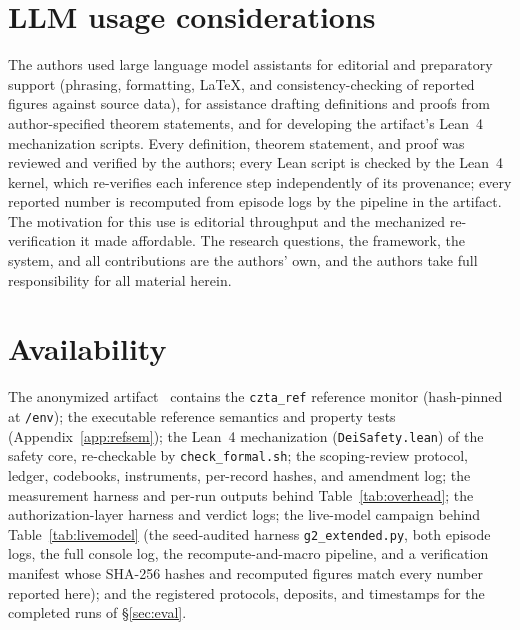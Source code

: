 \documentclass[conference,compsoc]{IEEEtran}
\theoremstyle{definition}
\theoremstyle{plain}
\begin{document}
\section*{LLM usage considerations}
The authors used large language model assistants for editorial and
preparatory support (phrasing, formatting, \LaTeX, and
consistency-checking of reported figures against source data), for
assistance drafting definitions and proofs from author-specified
theorem statements, and for developing the artifact's Lean~4
mechanization scripts. Every definition, theorem statement, and proof
was reviewed and verified by the authors; every Lean script is checked
by the Lean~4 kernel, which re-verifies each inference step
independently of its provenance; every reported number is recomputed
from episode logs by the pipeline in the artifact. The motivation for
this use is editorial throughput and the mechanized re-verification it
made affordable. The research questions, the framework, the system,
and all contributions are the authors' own, and the authors take full
responsibility for all material herein.

\section*{Availability}
The anonymized artifact~\cite{artifact} contains the \texttt{czta\_ref}
reference monitor (hash-pinned at \texttt{/env}); the executable
reference semantics and property tests (Appendix~\ref{app:refsem}); the
Lean~4 mechanization (\texttt{DeiSafety.lean}) of the safety core,
re-checkable by \texttt{check\_formal.sh}; the scoping-review protocol,
ledger, codebooks, instruments, per-record hashes, and amendment log;
the measurement harness and per-run outputs behind
Table~\ref{tab:overhead}; the authorization-layer harness and verdict
logs; the live-model campaign behind Table~\ref{tab:livemodel} (the
seed-audited harness \texttt{g2\_extended.py}, both episode logs, the
full console log, the recompute-and-macro pipeline, and a verification
manifest whose SHA-256 hashes and recomputed figures match every number
reported here); and the registered protocols, deposits, and timestamps
for the completed runs of \S\ref{sec:eval}.
\end{document}
